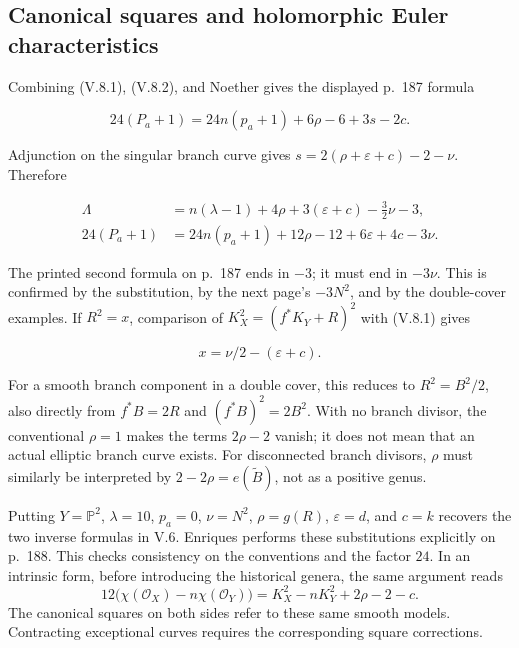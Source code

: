 \subsection{Canonical squares and holomorphic Euler characteristics}

Combining (V.8.1), (V.8.2), and Noether gives the displayed p.~187 formula

\[
24(P_a+1)=24n(p_a+1)+6\rho-6+3s-2c. \tag{V.8.3}
\]

Adjunction on the singular branch curve gives \(s=2(\rho+\varepsilon+c)-2-\nu\). Therefore

\[
\begin{aligned}
\Lambda&=n(\lambda-1)+4\rho+3(\varepsilon+c)-\tfrac32\nu-3,\\
24(P_a+1)&=24n(p_a+1)+12\rho-12+6\varepsilon+4c-3\nu.
\end{aligned} \tag{V.8.4}
\]

The printed second formula on p.~187 ends in \(-3\); it must end in \(-3\nu\). This is confirmed by the substitution, by the next page's \(-3N^2\), and by the double-cover examples. If \(R^2=x\), comparison of \(K_X^2=(f^*K_Y+R)^2\) with (V.8.1) gives

\[
x=\nu/2-(\varepsilon+c).
\]

For a smooth branch component in a double cover, this reduces to \(R^2=B^2/2\), also directly from \(f^*B=2R\) and \((f^*B)^2=2B^2\). With no branch divisor, the conventional \(\rho=1\) makes the terms \(2\rho-2\) vanish; it does not mean that an actual elliptic branch curve exists. For disconnected branch divisors, \(\rho\) must similarly be interpreted by \(2-2\rho=e(\widetilde B)\), not as a positive genus.

Putting \(Y=\mathbb P^2\), \(\lambda=10\), \(p_a=0\), \(\nu=N^2\), \(\rho=g(R)\), \(\varepsilon=d\), and \(c=k\) recovers the two inverse formulas in V.6. Enriques performs these substitutions explicitly on p.~188. This checks consistency on the conventions and the factor \(24\). In an intrinsic form, before introducing the historical genera, the same argument reads \[
12\bigl(\chi(\mathcal O_X)-n\chi(\mathcal O_Y)\bigr)
=K_X^2-nK_Y^2+2\rho-2-c.
\] The canonical squares on both sides refer to these same smooth models. Contracting exceptional curves requires the corresponding square corrections.

